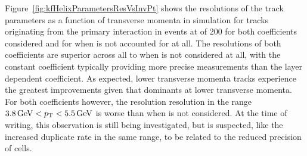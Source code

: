 \begin{table}[htbp]
\label{tab:trackFindingPerformance2GeVKF}
  \centering
\end{table}

Figure~\ref{fig:kfHelixParametersResVsInvPt} shows the resolutions of the track parameters as a function of transverse momenta in simulation for tracks originating from the primary interaction in \ttbar events at \PU of 200 for both \MS coefficients considered and for when \MS is not accounted for at all.
The resolutions of both \MS coefficients are superior across all \pt to when \MS is not considered at all, with the constant \MS coefficient typically providing more precise measurements than the layer dependent coefficient.  
As expected, lower transverse momenta tracks experience the greatest improvements given that \MS dominants at lower transverse momenta.
For both coefficients however, the \pt resolution resolution in the range $ 3.8 \,\text{Ge\hspace{-.08em}V} < p_{\mathrm{T}} < 5.5\,\text{Ge\hspace{-.08em}V}$ is worse than when \MS is not considered.
At the time of writing, this observation is still being investigated, but is suspected, like the increased duplicate rate in the same \pT range, to be related to the reduced precision of \HT cells.


